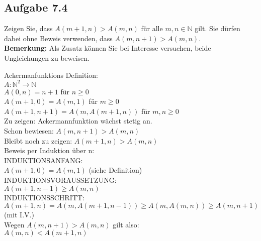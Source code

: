 \subsection*{Aufgabe 7.4}
Zeigen Sie, dass $A(m+1,n) > A(m,n)$ für alle $m,n \in \mathbb{N}$ gilt. Sie dürfen dabei ohne Beweis verwenden, dass $A(m,n+1) > A(m,n)$.\\
\textbf{Bemerkung:} Als Zusatz können Sie bei Interesse versuchen, beide Ungleichungen zu beweisen.

Ackermanfunktions Definition:\\
$A : \mathbb{N}^{2} \rightarrow \mathbb{N}$\\
$A(0,n) = n + 1$ für $n \ge 0$\\
$A(m + 1, 0) = A(m,1)$ für $m \ge 0$\\
$A(m + 1, n + 1) = A(m, A(m + 1, n))$ für $m,n \ge 0$\\

Zu zeigen: Ackermannfunktion wächst stetig an.\\
Schon bewiesen: $A(m, n+1) > A(m,n)$\\
Bleibt noch zu zeigen: $A(m + 1, n) > A(m,n)$\\

Beweis per Induktion über n:\\

INDUKTIONSANFANG:\\
$A(m+1, 0) = A(m,1)$ (siehe Definition)\\

INDUKTIONSVORAUSSETZUNG:\\
$A(m+1, n-1) \ge A(m,n)$\\

INDUKTIONSSCHRITT:\\
$A(m + 1, n) = A(m, A(m + 1, n - 1)) \ge A(m, A(m,n)) \ge A(m, n + 1)$ (mit I.V.)\\

Wegen $A(m, n+1) > A(m,n)$ gilt also:\\
$A(m,n) < A(m + 1,n)$










